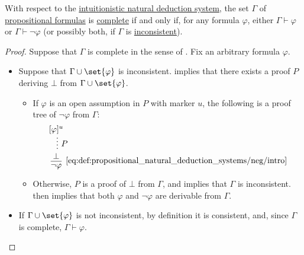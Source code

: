 \begin{proposition}\label{thm:propositional_complete_set}
  With respect to the \hyperref[def:propositional_natural_deduction_systems]{intuitionistic natural deduction system}, the set \( \Gamma \) of \hyperref[def:propositional_syntax/formula]{propositional formulas} is \hyperref[def:complete_set_of_sentences]{complete} if and only if, for any formula \( \varphi \), either \( \Gamma \vdash \varphi \) or \( \Gamma \vdash \neg \varphi \) (or possibly both, if \( \Gamma \) is \hyperref[def:consistent_set_of_sentences]{inconsistent}).
\end{proposition}
\begin{proof}
  \SufficiencySubProof Suppose that \( \Gamma \) is complete in the sense of . Fix an arbitrary formula \( \varphi \).

  \begin{itemize}
    \item Suppose that \( \Gamma \cup \set{ \varphi } \) is inconsistent.  implies that there exists a proof \( P \) deriving \( \bot \) from \( \Gamma \cup \set{ \varphi } \).

    \begin{itemize}
      \item If \( \varphi \) is an open assumption in \( P \) with marker \( u \), the following is a proof tree of \( \neg \varphi \) from \( \Gamma \):
      \begin{equation*}
        \begin{prooftree}
          \hypo{ [\varphi]^u }
          \ellipsis { \( P \) } { \bot }
          \infer1[\eqref{eq:def:propositional_natural_deduction_systems/neg/intro}]{ \neg \varphi }.
        \end{prooftree}
      \end{equation*}

      \item Otherwise, \( P \) is a proof of \( \bot \) from \( \Gamma \), and  implies that \( \Gamma \) is inconsistent.  then implies that both \( \varphi \) and \( \neg \varphi \) are derivable from \( \Gamma \).
    \end{itemize}

    \item If \( \Gamma \cup \set{ \varphi } \) is not inconsistent, by definition it is consistent, and, since \( \Gamma \) is complete, \( \Gamma \vdash \varphi \).
  \end{itemize}


\end{proof}
